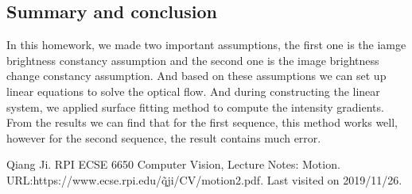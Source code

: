 \documentclass{article}
\begin{document}
\subsection*{Summary and conclusion}
\par
In this homework, we made two important assumptions, the first one is the iamge brightness constancy assumption and the second one is the image brightness change constancy assumption. And based on these assumptions we can set up linear equations to solve the optical flow. And during constructing the linear system, we applied surface fitting method to compute the intensity gradients. From the results we can find that for the first sequence, this method works well, however for the second sequence, the result contains much error.
\newpage
\begin{thebibliography}{}  
Qiang Ji. RPI ECSE 6650 Computer Vision, Lecture Notes: Motion. URL:https://www.ecse.rpi.edu/\~qji/CV/motion2.pdf. Last visited on 2019/11/26.
\end{thebibliography}
\end{document}

